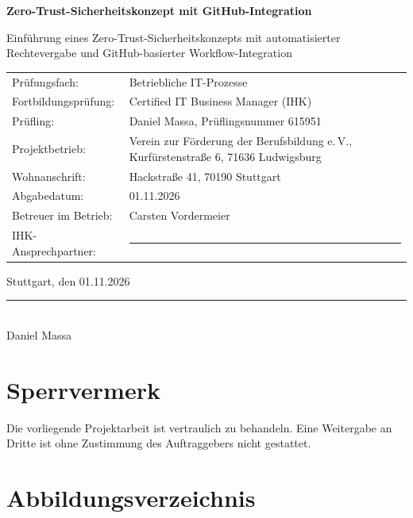 \documentclass[11pt,a4paper]{article}
\begin{document}
\begin{center}
\Large\bfseries Zero-Trust-Sicherheitskonzept mit GitHub-Integration\par
\vspace{4mm}
\large Einführung eines Zero-Trust-Sicherheitskonzepts mit automatisierter Rechtevergabe und GitHub-basierter Workflow-Integration\par
\end{center}
\vspace{8mm}
\begin{tabular}{@{}p{5cm}p{9.5cm}@{}}
Prüfungsfach: & Betriebliche IT-Prozesse \\
Fortbildungsprüfung: & Certified IT Business Manager (IHK) \\
Prüfling: & Daniel Massa, Prüflingsnummer 615951 \\
Projektbetrieb: & Verein zur Förderung der Berufsbildung e.\,V., Kurfürstenstraße 6, 71636 Ludwigsburg \\
Wohnanschrift: & Hackstraße 41, 70190 Stuttgart \\
Abgabedatum: & 01.11.2026 \\
Betreuer im Betrieb: & Carsten Vordermeier \\
IHK-Ansprechpartner: & \rule{5cm}{0.4pt} \\
\end{tabular}
\vspace{15mm}
Stuttgart, den 01.11.2026 \hfill \rule{6cm}{0.4pt} \\
\phantom{Stuttgart, den 01.11.2026} \hfill Daniel Massa

\newpage
\section*{Sperrvermerk}
Die vorliegende Projektarbeit ist vertraulich zu behandeln. Eine Weitergabe an Dritte ist ohne Zustimmung des Auftraggebers nicht gestattet.

\newpage
{}
\setcounter{page}{1}
\renewcommand{\contentsname}{Inhaltsverzeichnis}
\tableofcontents

\newpage
\section*{Abbildungsverzeichnis}

\end{document}

